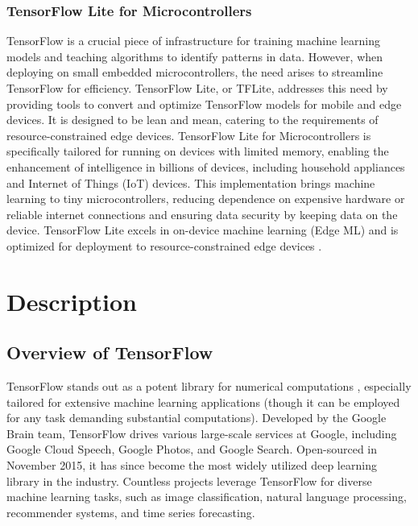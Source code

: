 \subsubsection{TensorFlow Lite for Microcontrollers}

TensorFlow is a crucial piece of infrastructure for training machine learning models and teaching algorithms to identify patterns in data. However, when deploying on small embedded microcontrollers, the need arises to streamline TensorFlow for efficiency. TensorFlow Lite, or TFLite, addresses this need by providing tools to convert and optimize TensorFlow models for mobile and edge devices. It is designed to be lean and mean, catering to the requirements of resource-constrained edge devices. TensorFlow Lite for Microcontrollers is specifically tailored for running on devices with limited memory, enabling the enhancement of intelligence in billions of devices, including household appliances and Internet of Things (IoT) devices. This implementation brings machine learning to tiny microcontrollers, reducing dependence on expensive hardware or reliable internet connections and ensuring data security by keeping data on the device. TensorFlow Lite excels in on-device machine learning (Edge ML) and is optimized for deployment to resource-constrained edge devices \cite{Dokic:2020}.



\section{Description}

\subsection{Overview of TensorFlow}

TensorFlow stands out as a potent library for numerical computations \cite{Geron:2022}, especially tailored for extensive machine learning applications (though it can be employed for any task demanding substantial computations). Developed by the Google Brain team, TensorFlow drives various large-scale services at Google, including Google Cloud Speech, Google Photos, and Google Search. Open-sourced in November 2015, it has since become the most widely utilized deep learning library in the industry. Countless projects leverage TensorFlow for diverse machine learning tasks, such as image classification, natural language processing, recommender systems, and time series forecasting.

